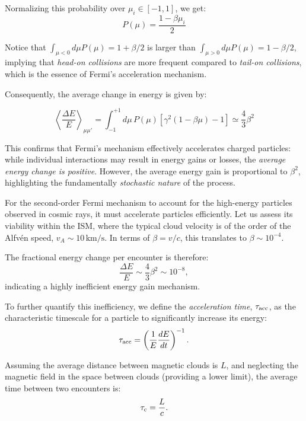 Normalizing this probability over \( \mu_i \in [-1,1] \), we get:
\begin{equation}
P(\mu) = \frac{1 - \beta \mu_i}{2}
\end{equation}

Notice that \( \int_{\mu < 0} d\mu P(\mu) = 1 + \beta / 2 \) is larger than \( \int_{\mu > 0} d\mu P(\mu) = 1 - \beta/2 \), implying that \emph{head-on collisions} are more frequent compared to \emph{tail-on collisions}, which is the essence of Fermi's acceleration mechanism.

Consequently, the average change in energy is given by:
%
\begin{remark}
\begin{equation}
\left\langle \frac{\Delta E}{E} \right\rangle_{\mu\mu'} 
= \int_{-1}^{+1} d\mu \, P(\mu) \left[ \gamma^2 \left( 1 - \beta \mu \right) - 1 \right] \simeq \frac{4}{3} \beta^2
\end{equation}
\end{remark}

This confirms that Fermi's mechanism effectively accelerates charged particles: while individual interactions may result in energy gains or losses, the \emph{average energy change is positive}. However, the average energy gain is proportional to \( \beta^2 \), highlighting the fundamentally \emph{stochastic nature} of the process. 

For the second-order Fermi mechanism to account for the high-energy particles observed in cosmic rays, it must accelerate particles efficiently. Let us assess its viability within the ISM, where the typical cloud velocity is of the order of the Alfvén speed, \( v_A \sim 10 \, \text{km/s} \). In terms of \( \beta = v / c \), this translates to \( \beta \sim 10^{-4} \). 

The fractional energy change per encounter is therefore:
\[
\frac{\Delta E}{E} \sim \frac{4}{3} \beta^2 \sim 10^{-8},
\]
indicating a highly inefficient energy gain mechanism. 

To further quantify this inefficiency, we define the \emph{acceleration time}, \( \tau_{\rm acc} \), as the characteristic timescale for a particle to significantly increase its energy:
\[
\tau_{\rm acc} = \left( \frac{1}{E} \frac{dE}{dt} \right)^{-1}.
\]

Assuming the average distance between magnetic clouds is \( L \), and neglecting the magnetic field in the space between clouds (providing a lower limit), the average time between two encounters is:
\[
\tau_{\rm c} = \frac{L}{c}.
\]

